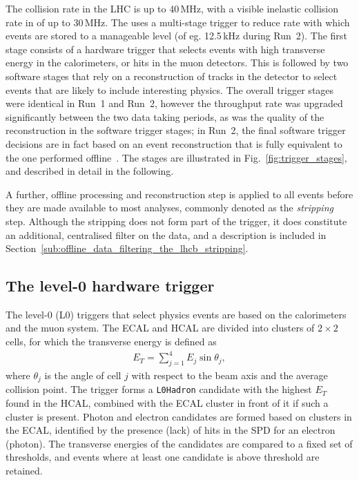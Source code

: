 The collision rate in the LHC is up to 40\,MHz, with a visible inelastic collision rate in \lhcb of up to 30\,MHz. The \lhcb uses a multi-stage trigger to reduce rate with which events are stored to a manageable level (of eg. 12.5\,kHz during Run~2). The first stage consists of a hardware trigger that selects events with high transverse energy in the calorimeters, or hits in the muon detectors. This is followed by two software stages that rely on a reconstruction of tracks in the detector to select events that are likely to include interesting physics.  The overall trigger stages were identical in Run~1 and Run~2, however the throughput rate was upgraded significantly between the two data taking periods, as was the quality of the reconstruction in the software trigger stages; in Run~2, the final software trigger decisions are in fact based on an event reconstruction that is fully equivalent to the  one performed offline~\cite{Trigger-Performance2}.  The stages are illustrated in Fig.~\ref{fig:trigger_stages}, and described in detail in the following.

A further, offline processing and reconstruction step is applied to all events before they are made available to most \lhcb analyses, commonly denoted as the \emph{stripping} step. Although the stripping does not form part of the \lhcb trigger, it does constitute an additional, centralised filter on the data, and a description is included in Section~\ref{sub:offline_data_filtering_the_lhcb_stripping}.



\subsection{The level-0 hardware trigger} %
\label{sub:the_level_0_hardware_trigger}

The level-0 (L0) triggers that select physics events are based on the calorimeters and the muon system. 
The ECAL and HCAL are divided into clusters of $2\times2$ cells, for which the transverse energy is defined as
\begin{align}
    E_T=\sum_{j=1}^4 E_j \sin \theta_j,
\end{align}
where $\theta_j$ is the angle of cell $j$ with respect to the beam axis and the average collision point. The trigger forms a \texttt{L0Hadron} candidate with the highest $E_T$ found in the HCAL, combined with the ECAL cluster in front of it if such a cluster is present. Photon and electron candidates are formed based on clusters in the ECAL, identified by the presence (lack) of hits in the SPD for an electron (photon). The transverse energies of the candidates are compared to a fixed set of thresholds, and events where at least one candidate is above threshold are retained.

